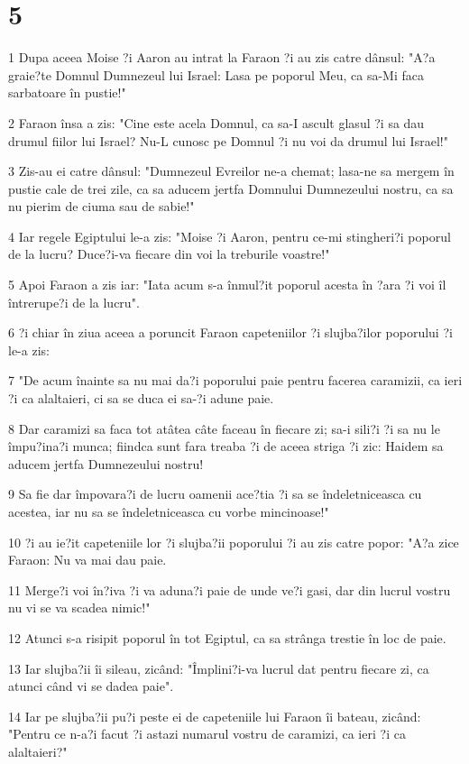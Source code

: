\chapter{5}

\par 1 Dupa aceea Moise ?i Aaron au intrat la Faraon ?i au zis catre dânsul: "A?a graie?te Domnul Dumnezeul lui Israel: Lasa pe poporul Meu, ca sa-Mi faca sarbatoare în pustie!"
\par 2 Faraon însa a zis: "Cine este acela Domnul, ca sa-I ascult glasul ?i sa dau drumul fiilor lui Israel? Nu-L cunosc pe Domnul ?i nu voi da drumul lui Israel!"
\par 3 Zis-au ei catre dânsul: "Dumnezeul Evreilor ne-a chemat; lasa-ne sa mergem în pustie cale de trei zile, ca sa aducem jertfa Domnului Dumnezeului nostru, ca sa nu pierim de ciuma sau de sabie!"
\par 4 Iar regele Egiptului le-a zis: "Moise ?i Aaron, pentru ce-mi stingheri?i poporul de la lucru? Duce?i-va fiecare din voi la treburile voastre!"
\par 5 Apoi Faraon a zis iar: "Iata acum s-a înmul?it poporul acesta în ?ara ?i voi îl întrerupe?i de la lucru".
\par 6 ?i chiar în ziua aceea a poruncit Faraon capeteniilor ?i slujba?ilor poporului ?i le-a zis:
\par 7 "De acum înainte sa nu mai da?i poporului paie pentru facerea caramizii, ca ieri ?i ca alaltaieri, ci sa se duca ei sa-?i adune paie.
\par 8 Dar caramizi sa faca tot atâtea câte faceau în fiecare zi; sa-i sili?i ?i sa nu le împu?ina?i munca; fiindca sunt fara treaba ?i de aceea striga ?i zic: Haidem sa aducem jertfa Dumnezeului nostru!
\par 9 Sa fie dar împovara?i de lucru oamenii ace?tia ?i sa se îndeletniceasca cu acestea, iar nu sa se îndeletniceasca cu vorbe mincinoase!"
\par 10 ?i au ie?it capeteniile lor ?i slujba?ii poporului ?i au zis catre popor: "A?a zice Faraon: Nu va mai dau paie.
\par 11 Merge?i voi în?iva ?i va aduna?i paie de unde ve?i gasi, dar din lucrul vostru nu vi se va scadea nimic!"
\par 12 Atunci s-a risipit poporul în tot Egiptul, ca sa strânga trestie în loc de paie.
\par 13 Iar slujba?ii îi sileau, zicând: "Împlini?i-va lucrul dat pentru fiecare zi, ca atunci când vi se dadea paie".
\par 14 Iar pe slujba?ii pu?i peste ei de capeteniile lui Faraon îi bateau, zicând: "Pentru ce n-a?i facut ?i astazi numarul vostru de caramizi, ca ieri ?i ca alaltaieri?"
